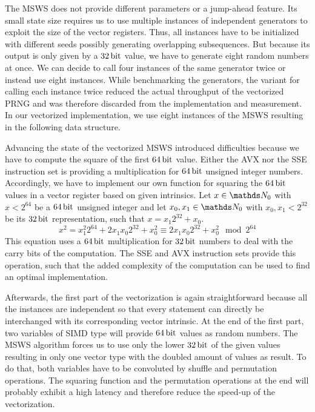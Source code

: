 \documentclass{stdlocal}
\begin{document}
    The MSWS does not provide different parameters or a jump-ahead feature.
    Its small state size requires us to use multiple instances of independent generators to exploit the size of the vector registers.
    Thus, all instances have to be initialized with different seeds possibly generating overlapping subsequences.
    But because its output is only given by a $32\, \mathrm{bit}$ value, we have to generate eight random numbers at once.
    We can decide to call four instances of the same generator twice or instead use eight instances.
    While benchmarking the generators, the variant for calling each instance twice reduced the actual throughput of the vectorized PRNG and was therefore discarded from the implementation and measurement.
    In our vectorized implementation, we use eight instances of the MSWS resulting in the following data structure.

    Advancing the state of the vectorized MSWS introduced difficulties because we have to compute the square of the first $64\, \mathrm{bit}$ value.
    Either the AVX nor the SSE instruction set is providing a multiplication for $64\, \mathrm{bit}$ unsigned integer numbers.
    Accordingly, we have to implement our own function for squaring the $64\, \mathrm{bit}$ values in a vector register based on given intrinsics.
    Let $x\in\setNatural_0$ with $x < 2^{64}$ be a $64\, \mathrm{bit}$ unsigned integer and let $x_0,x_1\in\setNatural_0$ with $x_0,x_1 < 2^{32}$ be its $32\, \mathrm{bit}$ representation, such that $x = x_1 2^{32} + x_0$.
    \[
      x^2 = x_1^2 2^{64} + 2x_1x_0 2^{32} + x_0^2 \equiv 2x_1x_0 2^{32} + x_0^2 \mod 2^{64}
    \]
    This equation uses a $64\, \mathrm{bit}$ multiplication for $32\, \mathrm{bit}$ numbers to deal with the carry bits of the computation.
    The SSE and AVX instruction sets provide this operation, such that the added complexity of the computation can be used to find an optimal implementation.

    Afterwards, the first part of the vectorization is again straightforward because all the instances are independent so that every statement can directly be interchanged with its corresponding vector intrinsic.
    At the end of the first part, two variables of SIMD type will provide $64\, \mathrm{bit}$ values as random numbers.
    The MSWS algorithm forces us to use only the lower $32\, \mathrm{bit}$ of the given values resulting in only one vector type with the doubled amount of values as result.
    To do that, both variables have to be convoluted by shuffle and permutation operations.
    The squaring function and the permutation operations at the end will probably exhibit a high latency and therefore reduce the speed-up of the vectorization.
\end{document}

